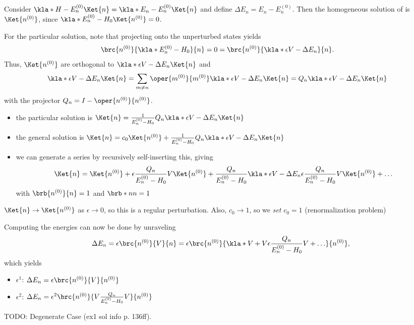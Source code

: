 \documentclass[english, parskip=full]{scrbook}
\newcommand{\definition}[2]{\begin{tcolorbox}[colback=colorbackgrounddefinition,colframe=colordefinition, breakable,enhanced,title=\textbf{#1}.]#2\end{tcolorbox}}
\newcommand{\note}[1]{\begin{tcolorbox}[colback=colorbackgroundnote,colframe=colornote, breakable,enhanced]#1\end{tcolorbox}}
\begin{document}
\definition{General Method}{Consider $\kla*{H-E_n^{(0)}} \Ket{n} = \kla*{E_n - E_n^{(0)}}\Ket{n}$ and define $\Delta E_n = E_n - E_n^{(0)}$.
Then the homogeneous solution of is $\Ket{n^{(0)}}$, since $\kla*{E_n^{(0)} - H_0}\Ket{n^{(0)}} = 0$.

For the particular solution, note that projecting onto the unperturbed states yields
\begin{align}
\brc{n^{(0)}}{\kla*{E_n^{(0)} - H_0}}{n} &= 0 = \brc{n^{(0)}}{\kla*{\epsilon V - \Delta E_n}}{n}.
\end{align}
Thus, $\Ket{n^{(0)}}$ are orthogonal to $\kla*{\epsilon V - \Delta E_n}\Ket{n}$ and
\begin{align}
\kla*{\epsilon V - \Delta E_n}\Ket{n} &= \sum_{m\neq n} \oper{m^{(0)}}{m^{(0)}} \kla*{\epsilon V - \Delta E_n} \Ket{n} = Q_n \kla*{\epsilon V - \Delta E_n} \Ket{n}
\end{align}
with the projector $Q_n = I - \oper{n^{(0)}}{n^{(0)}}$.
\begin{itemize}
\item the particular solution is $\Ket{n} = \frac{1}{E_n^{(0)} - H_0} Q_n \kla*{\epsilon V - \Delta E_n} \Ket{n}$
\item the general solution is $\Ket{n} = c_0 \Ket{n^{(0)}} + \frac{1}{E_n^{(0)} - H_0} Q_n \kla*{\epsilon V - \Delta E_n} \Ket{n}$
\item we can generate a series by recursively self-inserting this, giving \begin{align}
\Ket{n} &= \Ket{n^{(0)}} + \epsilon \frac{Q_n}{E_n^{(0)} - H_0} V\Ket{n^{(0)}} + \frac{Q_n}{E_n^{(0)} - H_0} \kla*{\epsilon V - \Delta E_n} \epsilon \frac{Q_n}{E_n^{(0)} - H_0} V \Ket{n^{(0)}} + \dots
\end{align} with $\brb{n^{(0)}}{n} = 1$ and $\brb*{n}{n}=1$
\end{itemize}
\note{$\Ket{n} \rightarrow \Ket{n^{(0)}}$ as $\epsilon\rightarrow 0$, so this is a regular perturbation.
Also, $c_0\rightarrow 1$, so we \emph{set} $c_0=1$ (renormalization problem)}
Computing the energies can now be done by unraveling $$\Delta E_n = \epsilon \brc{n^{(0)}}{V}{n} = \epsilon \brc{n^{(0)}}{\kla*{V + V \epsilon \frac{Q_n}{E_n^{(0)} - H_0} V + \dots}}{n^{(0)}},$$ which yields
\begin{itemize}
\item $\epsilon^1$: $\Delta E_n = \epsilon \brc{n^{(0)}}{V}{n^{(0)}}$
\item $\epsilon^2$: $\Delta E_n = \epsilon^2 \brc{n^{(0)}}{V \frac{Q_n}{E_n^{(0)} - H_0} V}{n^{(0)}}$
\end{itemize}
}
TODO: Degenerate Case (ex1 sol info p. 136ff).
\end{document}

